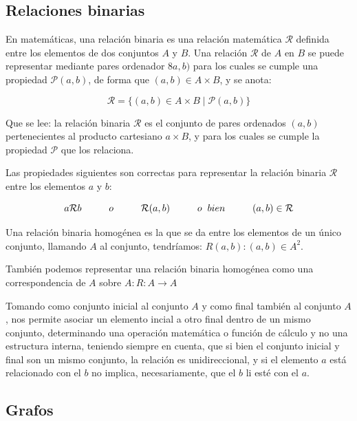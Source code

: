 \documentclass[10pt]{article}
\begin{document}
\subsection{Relaciones binarias}

En matemáticas, una relación binaria es una relación matemática $\mathcal{R}$ definida entre los elementos de dos conjuntos $A$ y $B$. Una relación $\mathcal{R}$ de $A$ en $B$ se puede representar mediante pares ordenador $8a,b)$ para los cuales se cumple una propiedad $\mathcal{P}(a,b)$, de forma que $(a,b) \in A\times B$, y se anota:

$$
\mathcal{R} = \{(a,b) \in A\times B  \mid   \mathcal{P}(a,b)\}
$$

Que se lee: la relación binaria $\mathcal{R}$ es el conjunto de pares ordenados $(a,b)$ pertenecientes al producto cartesiano $a\times B$, y para los cuales se cumple la propiedad $\mathcal{P}$ que los relaciona.

Las propiedades siguientes son correctas para representar la relación binaria $\mathcal{R}$ entre los elementos $a$ y $b$:

$$
a\mathcal{R}b \hspace{1cm} o \hspace{1cm}\mathcal{R}(a,b)\hspace{1cm} o\hspace{0.2cm}bien\hspace{1cm}(a,b) \in \mathcal{R}
$$

Una relación binaria homogénea es la que se da entre los elementos de un único conjunto, llamando $A$ al conjunto, tendríamos: $R(a,b) : (a,b) \in A^2$.

También podemos representar una relación binaria homogénea como una correspondencia de $A$ sobre $A: R: A \rightarrow A$

Tomando como conjunto inicial al conjunto $A$ y como final también al conjunto $A$, nos permite asociar un elemento incial a otro final dentro de un mismo conjunto, determinando una operación matemática o función de cálculo y no una estructura interna, teniendo siempre en cuenta, que si bien el conjunto inicial y final son un mismo conjunto, la relación es unidireccional, y si el elemento $a$ está relacionado con el $b$ no implica, necesariamente, que el $b$ li esté con el $a$.


\subsection{Grafos}
\end{document}
